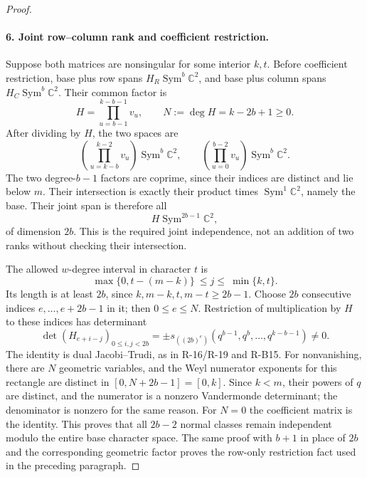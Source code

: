\documentclass[11pt,a4paper]{article}
\theoremstyle{definition}\newtheorem{definition}{Definition}
\begin{document}
\begin{proof}
\paragraph{6. Joint row--column rank and coefficient restriction.}
Suppose both matrices are nonsingular for some interior $k,t$.
Before coefficient restriction, base plus row spans
$H_R\operatorname{Sym}^b\mathbb C^2$, and base plus column spans
$H_C\operatorname{Sym}^b\mathbb C^2$. Their common factor is
\[
 H=\prod_{u=b-1}^{k-b-1}v_u,
 \qquad N:=\deg H=k-2b+1\geq0.
\]
After dividing by $H$, the two spaces are
\[
 \left(\prod_{u=k-b}^{k-2}v_u\right)\operatorname{Sym}^b\mathbb C^2,
 \qquad
 \left(\prod_{u=0}^{b-2}v_u\right)\operatorname{Sym}^b\mathbb C^2.
\]
The two degree-$b-1$ factors are coprime, since their indices are
distinct and lie below $m$. Their intersection is exactly their
product times $\operatorname{Sym}^1\mathbb C^2$, namely the base.
Their joint span is therefore all
\begin{equation}\label{R22:joint_space}
 H\operatorname{Sym}^{2b-1}\mathbb C^2,
\end{equation}
of dimension $2b$. This is the required joint independence, not an
addition of two ranks without checking their intersection.

The allowed $w$-degree interval in character $t$ is
\[
 \max\{0,t-(m-k)\}\ \leq j\leq\ \min\{k,t\}.
\]
Its length is at least $2b$, since $k,m-k,t,m-t\geq2b-1$.
Choose $2b$ consecutive indices $e,\ldots,e+2b-1$ in it;
then $0\leq e\leq N$. Restriction of multiplication by $H$ to
these indices has determinant
\begin{equation}\label{R22:schur}
 \det(H_{e+i-j})_{0\leq i,j<2b}
 =\pm s_{((2b)^e)}(q^{b-1},q^b,\ldots,q^{k-b-1})\ne0.
\end{equation}
The identity is dual Jacobi--Trudi, as in R-16/R-19 and R-B15.
For nonvanishing, there are $N$ geometric variables, and the Weyl
numerator exponents for this rectangle are distinct in
$[0,N+2b-1]=[0,k]$. Since $k<m$, their powers of $q$ are distinct,
and the numerator is a nonzero Vandermonde determinant; the
denominator is nonzero for the same reason. For $N=0$ the coefficient
matrix is the identity. This proves that all $2b-2$ normal classes
remain independent modulo the entire base character space.
The same proof with $b+1$ in place of $2b$ and the corresponding
geometric factor proves the row-only restriction fact used in the
preceding paragraph.


\end{proof}
\end{document}
